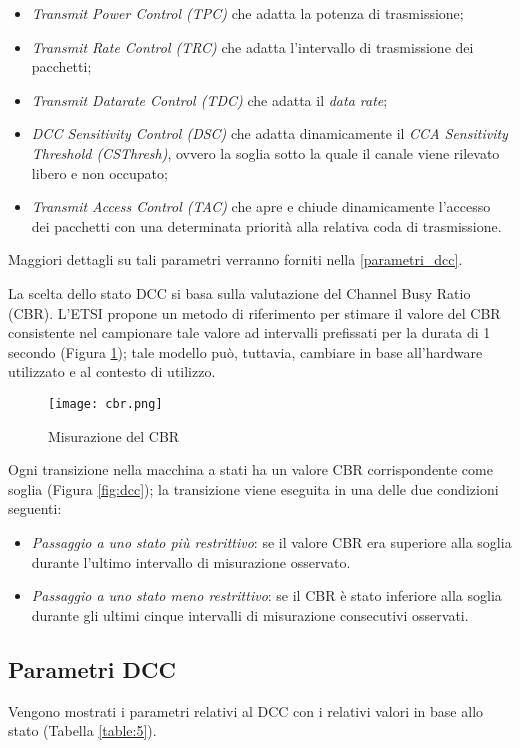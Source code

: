 \begin{itemize}
    \item \textit{Transmit Power Control (TPC)} che adatta la potenza di trasmissione;
    \item \textit{Transmit Rate Control (TRC)} che adatta l'intervallo di trasmissione dei pacchetti;
    \item \textit{Transmit Datarate Control (TDC)} che adatta il \textit{data rate};
    \item \textit{DCC Sensitivity Control (DSC)} che adatta dinamicamente il \textit{CCA Sensitivity Threshold (CSThresh)}, ovvero la soglia sotto la quale il canale viene rilevato libero e non occupato;
    \item \textit{Transmit Access Control (TAC)} che apre e chiude dinamicamente l'accesso dei pacchetti con una determinata priorità alla relativa coda di trasmissione.
\end{itemize}

\noindent Maggiori dettagli su tali parametri verranno forniti nella \autoref{parametri_dcc}.

La scelta dello stato DCC si basa sulla valutazione del Channel Busy Ratio (CBR). L'ETSI propone un metodo di riferimento per stimare il valore del CBR consistente nel campionare tale valore ad intervalli prefissati per la durata di 1 secondo (Figura \ref{fig:cbr}); tale modello può, tuttavia, cambiare in base all'hardware utilizzato e al contesto di utilizzo.

\begin{figure}[h!]
    \centering
    \texttt{[image: cbr.png]}
    \caption{Misurazione del CBR}
    \label{fig:cbr}
\end{figure}

Ogni transizione nella macchina a stati ha un valore CBR corrispondente come soglia (Figura \ref{fig:dcc}); la transizione viene eseguita in
una delle due condizioni seguenti:
\begin{itemize}
    \item \textit{Passaggio a uno stato più restrittivo}: se il valore CBR era superiore alla soglia durante l'ultimo intervallo di misurazione osservato.
    \item \textit{Passaggio a uno stato meno restrittivo}: se il CBR è stato inferiore alla soglia durante gli ultimi cinque intervalli di misurazione consecutivi osservati.
\end{itemize}

\subsection[Parametri DCC]{Parametri DCC}
\label{parametri_dcc}
Vengono mostrati i parametri relativi al DCC con i relativi valori in base allo stato \cite{6686471} (Tabella \ref{table:5}).

